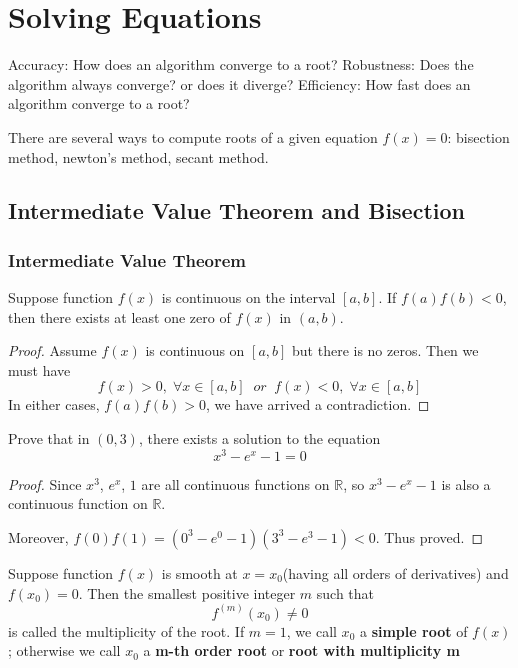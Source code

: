
\chapter{Solving Equations}

Accuracy: How does an algorithm converge to a root?
Robustness: Does the algorithm always converge? or does it diverge?
Efficiency: How fast does an algorithm converge to a root?


There are several ways to compute roots of a given equation $f(x) = 0$: bisection method, newton's method, secant method. 
\section{Intermediate Value Theorem and Bisection}
\subsection*{Intermediate Value Theorem}
\begin{thm}
	Suppose function $f(x)$ is continuous on the interval $[a,b]$. If $f(a)f(b)<0$, then there exists at least one zero of $f(x)$ in $(a,b)$.  
\end{thm}
\begin{proof}
	Assume $f(x)$ is continuous on $[a,b]$ but there is no zeros. Then we must have 
	\[ f(x)>0,\; \forall x\in[a,b]\;\; or \;\; f(x)<0,\; \forall x\in [a,b]  \]
	In either cases, $f(a)f(b) > 0$, we have arrived a contradiction.
\end{proof}
\begin{ex}
	Prove that in $(0,3)$, there exists a solution to the equation 
	\[ x^3 - e^x - 1 = 0 \]
\end{ex}
\begin{proof}
	Since $x^3$, $e^x$, $1$ are all continuous functions on $\mathbb{R}$, so $x^3 - e^x - 1$ is also a continuous function on $\mathbb{R}$.
	
	Moreover, $f(0)f(1) = (0^3 - e^0 - 1)(3^3 - e^3 - 1) < 0$. Thus proved.
\end{proof}

\begin{definition}
	Suppose function $f(x)$ is smooth at $x=x_0$(having all orders of derivatives) and $f(x_0)=0$. Then the smallest positive integer $m$ such that 
	\[ f^{(m)}(x_0) \neq 0 \]
	is called the multiplicity of the root. If $m=1$, we call $x_0$ a \textbf{simple root} of $f(x)$; otherwise we call $x_0$ a \textbf{m-th order root} or \textbf{root with multiplicity m} 
\end{definition}

